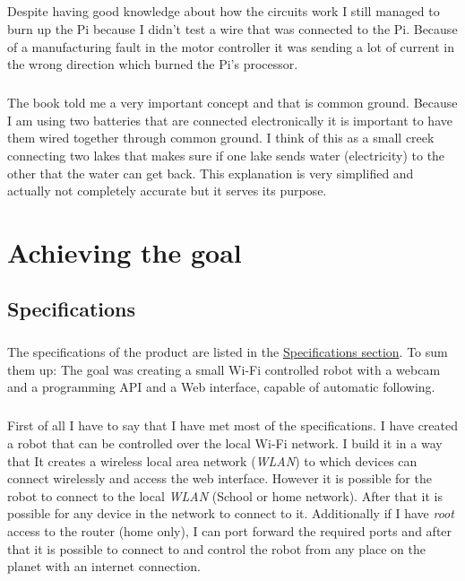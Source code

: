\documentclass[12pt,a4paper]{report}
\begin{document}
\paragraph{}
Despite having good knowledge about how the circuits work I still managed to burn up the Pi because I didn’t test a wire that was connected to the Pi. Because of a manufacturing fault in the motor controller it was sending a lot of current in the wrong direction which burned the Pi’s processor.

\paragraph{}
The book told me a very important concept and that is common ground. Because I am using two batteries that are connected electronically it is important to have them wired together through common ground. I think of this as a small creek connecting two lakes that makes sure if one lake sends water (electricity) to the other that the water can get back. This explanation is very simplified and actually not completely accurate but it serves its purpose.


\chapter{Achieving the goal}


\section{Specifications}

\paragraph{}
The specifications of the product are listed in the \hyperlink{specifications}{Specifications section}. To sum them up: The goal was creating a small Wi-Fi controlled robot with a webcam and a programming API and a Web interface, capable of automatic following.

\paragraph{}
First of all I have to say that I have met most of the specifications. I have created a robot that can be controlled over the local Wi-Fi network. I build it in a way that It creates a wireless local area network (\textit{WLAN}) to which devices can connect wirelessly and access the web interface. However it is possible for the robot to connect to the local \textit{WLAN} (School or home network). After that it is possible for any device in the network to connect to it. Additionally if I have \textit{root} access to the router (home only), I can port forward the required ports and after that it is possible to connect to and control the robot from any place on the planet with an internet connection.
\end{document}
